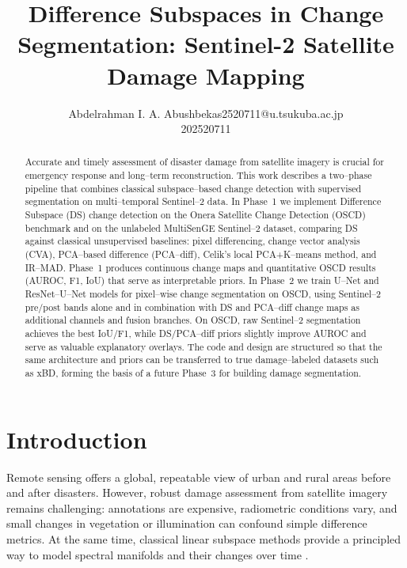 \documentclass[twoside,11pt]{article}
\makeatletter
\newcommand\studentName{Abdelrahman I. A. Abushbeka}                  %
\newcommand\studentEmail{s2520711@u.tsukuba.ac.jp}          %
\newcommand\studentNumber{202520711}                %
\makeatother
\begin{document}
    
    \title{Difference Subspaces in Change Segmentation: Sentinel-2 Satellite Damage Mapping}
    
    \author{\name \studentName \email \studentEmail \\
    \studentNumber
    \addr
    }
    
    \maketitle

\begin{abstract}
\noindent
Accurate and timely assessment of disaster damage from satellite imagery is
crucial for emergency response and long--term reconstruction. This work
describes a two--phase pipeline that combines classical subspace--based change
detection with supervised segmentation on multi--temporal Sentinel--2 data. In
Phase~1 we implement Difference Subspace (DS) change detection on the Onera
Satellite Change Detection (OSCD) benchmark and on the unlabeled MultiSenGE
Sentinel--2 dataset, comparing DS against classical unsupervised baselines:
pixel differencing, change vector analysis (CVA), PCA--based difference
(PCA--diff), Celik's local PCA+K--means method, and IR--MAD. Phase~1 produces
continuous change maps and quantitative OSCD results (AUROC, F1, IoU) that
serve as interpretable priors. In Phase~2 we train U--Net and ResNet--U--Net
models for pixel--wise change segmentation on OSCD, using Sentinel--2 pre/post
bands alone and in combination with DS and PCA--diff change maps as additional
channels and fusion branches. On OSCD, raw Sentinel--2 segmentation achieves
the best IoU/F1, while DS/PCA--diff priors slightly improve AUROC and serve as
valuable explanatory overlays. The code and design are structured so that the
same architecture and priors can be transferred to true damage--labeled
datasets such as xBD, forming the basis of a future Phase~3 for building damage
segmentation.
\end{abstract}

\section{Introduction}

Remote sensing offers a global, repeatable view of urban and rural areas before
and after disasters. However, robust damage assessment from satellite imagery
remains challenging: annotations are expensive, radiometric conditions vary,
and small changes in vegetation or illumination can confound simple difference
metrics. At the same time, classical linear subspace methods provide a
principled way to model spectral manifolds and their changes over time
\cite{FukuiMaki2015,FukuiSubspace}.
\end{document}
